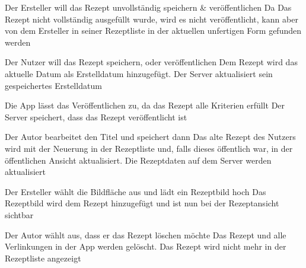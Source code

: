 {Der Ersteller will das Rezept unvollständig speichern \& veröffentlichen}
{Da Das Rezept nicht vollständig ausgefüllt wurde, wird es nicht veröffentlicht, kann aber von dem Ersteller in seiner Rezeptliste in der aktuellen unfertigen Form gefunden werden}


{Der Nutzer will das Rezept speichern, oder veröffentlichen}
{Dem Rezept wird das aktuelle Datum als Erstelldatum hinzugefügt. Der Server aktualisiert sein gespeichertes Erstelldatum}

{Die App lässt das Veröffentlichen zu, da das Rezept alle Kriterien erfüllt}
{Der Server speichert, dass das Rezept veröffentlicht ist}



{Der Autor bearbeitet den Titel und speichert dann}
{Das alte Rezept des Nutzers wird mit der Neuerung in der Rezeptliste und, falls dieses öffentlich war, in der öffentlichen Ansicht aktualisiert. Die Rezeptdaten auf dem Server werden aktualisiert}


{Der Ersteller wählt die Bildfläche aus und lädt ein Rezeptbild hoch}
{Das Rezeptbild wird dem Rezept hinzugefügt und ist nun bei der Rezeptansicht sichtbar}

{Der Autor wählt aus, dass er das Rezept löschen möchte}
{Das Rezept und alle Verlinkungen in der App werden gelöscht. Das Rezept wird nicht mehr in der Rezeptliste angezeigt}

